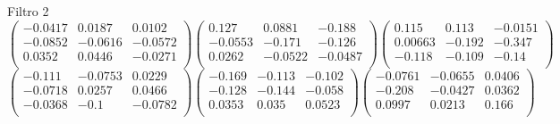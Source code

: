Filtro 2
{ \small
\[
\begin{pmatrix}
  -0.0417 & 0.0187 & 0.0102 \\
  -0.0852 & -0.0616 & -0.0572 \\
  0.0352 & 0.0446 & -0.0271 \\
\end{pmatrix}
\begin{pmatrix}
  0.127 & 0.0881 & -0.188 \\
  -0.0553 & -0.171 & -0.126 \\
  0.0262 & -0.0522 & -0.0487 \\
\end{pmatrix}
\begin{pmatrix}
  0.115 & 0.113 & -0.0151 \\
  0.00663 & -0.192 & -0.347 \\
  -0.118 & -0.109 & -0.14 \\
\end{pmatrix}
\]
\[
\begin{pmatrix}
  -0.111 & -0.0753 & 0.0229 \\
  -0.0718 & 0.0257 & 0.0466 \\
  -0.0368 & -0.1 & -0.0782 \\
\end{pmatrix}
\begin{pmatrix}
  -0.169 & -0.113 & -0.102 \\
  -0.128 & -0.144 & -0.058 \\
  0.0353 & 0.035 & 0.0523 \\
\end{pmatrix}
\begin{pmatrix}
  -0.0761 & -0.0655 & 0.0406 \\
  -0.208 & -0.0427 & 0.0362 \\
  0.0997 & 0.0213 & 0.166 \\
\end{pmatrix}
\]
}


